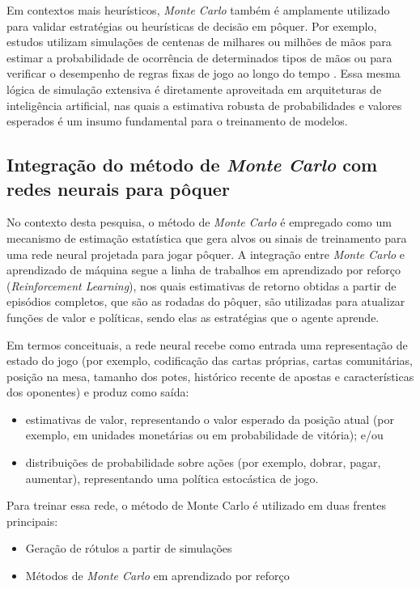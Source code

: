 Em contextos mais heurísticos, \textit{Monte Carlo} também é amplamente utilizado para validar estratégias ou heurísticas de decisão em pôquer. Por exemplo, estudos utilizam simulações de centenas de milhares ou milhões de mãos para estimar a probabilidade de ocorrência de determinados tipos de mãos ou para verificar o desempenho de regras fixas de jogo ao longo do tempo . Essa mesma lógica de simulação extensiva é diretamente aproveitada em arquiteturas de inteligência artificial, nas quais a estimativa robusta de probabilidades e valores esperados é um insumo fundamental para o treinamento de modelos.

\subsection{Integração do método de \textit{Monte Carlo} com redes neurais para pôquer}

No contexto desta pesquisa, o método de \textit{Monte Carlo} é empregado como um mecanismo de estimação estatística que gera alvos ou sinais de treinamento para uma rede neural projetada para jogar pôquer. A integração entre \textit{Monte Carlo} e aprendizado de máquina segue a linha de trabalhos em aprendizado por reforço (\textit{Reinforcement Learning}), nos quais estimativas de retorno obtidas a partir de episódios completos, que são as rodadas do pôquer, são utilizadas para atualizar funções de valor e políticas, sendo elas as estratégias que o agente aprende.

Em termos conceituais, a rede neural recebe como entrada uma representação de estado do jogo (por exemplo, codificação das cartas próprias, cartas comunitárias, posição na mesa, tamanho dos potes, histórico recente de apostas e características dos oponentes) e produz como saída:
\begin{itemize}
      \item estimativas de valor, representando o valor esperado da posição atual (por exemplo, em unidades monetárias ou em probabilidade de vitória); e/ou
      \item distribuições de probabilidade sobre ações (por exemplo, dobrar, pagar, aumentar), representando uma política estocástica de jogo.
\end{itemize}
Para treinar essa rede, o método de Monte Carlo é utilizado em duas frentes principais:
\begin{itemize}
      \item Geração de rótulos a partir de simulações
      \item Métodos de \textit{Monte Carlo} em aprendizado por reforço
\end{itemize}

